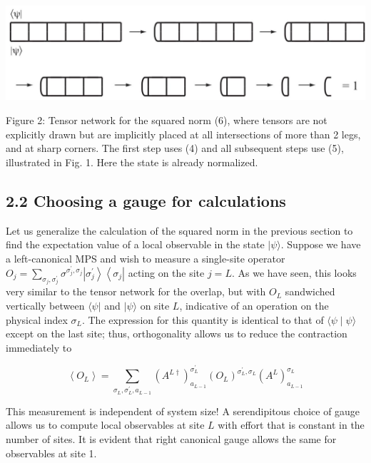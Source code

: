 \documentclass[12pt]{article}
\begin{document}
\begin{center}
\includegraphics[max width=\textwidth]{2024_05_17_c251ec82fd3768475949g-04(1)}
\end{center}

Figure 2: Tensor network for the squared norm (6), where tensors are not explicitly drawn but are implicitly placed at all intersections of more than 2 legs, and at sharp corners. The first step uses (4) and all subsequent steps use (5), illustrated in Fig. 1. Here the state is already normalized.

\subsection*{2.2 Choosing a gauge for calculations}
Let us generalize the calculation of the squared norm in the previous section to find the expectation value of a local observable in the state $|\psi\rangle$. Suppose we have a left-canonical MPS and wish to measure a single-site operator $O_{j}=\sum_{\sigma_{j}, \sigma_{j}^{\prime}} \sigma^{\sigma_{j}^{\prime}, \sigma_{j}}\left|\sigma_{j}^{\prime}\right\rangle\left\langle\sigma_{j}\right|$ acting on the site $j=L$. As we have seen, this looks very similar to the tensor network for the overlap, but with $O_{L}$ sandwiched vertically between $\langle\psi|$ and $|\psi\rangle$ on site $L$, indicative of an operation on the physical index $\sigma_{L}$. The expression for this quantity is identical to that of $\langle\psi \mid \psi\rangle$ except on the last site; thus, orthogonality allows us to reduce the contraction immediately to


\begin{equation*}
\left\langle O_{L}\right\rangle=\sum_{\sigma_{L}, \sigma_{L}^{\prime}, a_{L-1}}\left(A^{L \dagger}\right)_{a_{L-1}}^{\sigma_{L}^{\prime}}\left(O_{L}\right)^{\sigma_{L}^{\prime}, \sigma_{L}}\left(A^{L}\right)_{a_{L-1}}^{\sigma_{L}} \tag{7}
\end{equation*}


This measurement is independent of system size! A serendipitous choice of gauge allows us to compute local observables at site $L$ with effort that is constant in the number of sites. It is evident that right canonical gauge allows the same for observables at site 1.
\end{document}
